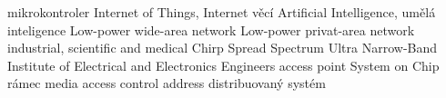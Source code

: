\def\ctustyle{{\ssr CTUstyle}}
\def\ttb{\tt\char`\\} %

 {mikrokontroler}
 {Internet of Things, Internet věcí}
 {Artificial Intelligence, umělá inteligence}
 {Low-power wide-area network}
 {Low-power privat-area network}
 {industrial, scientific and medical}
 {Chirp Spread Spectrum}
 {Ultra Narrow-Band}
 {Institute of Electrical and Electronics Engineers}
 {access point}
 {System on Chip}
 {rámec}
 {media access control address}
 {distribuovaný systém}
\makeglos
